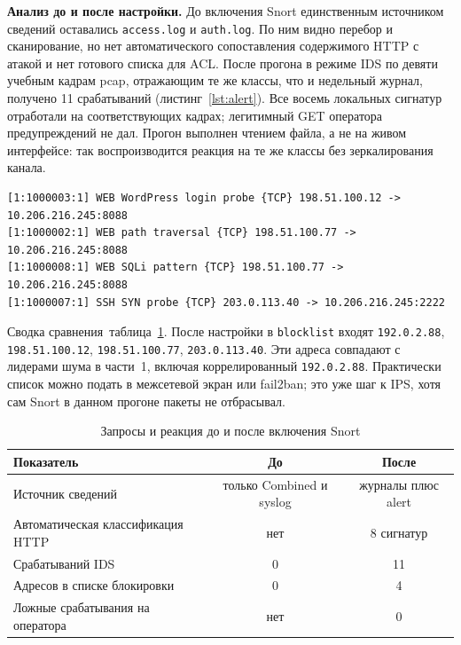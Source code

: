 \textbf{Анализ до и после настройки.}
До включения Snort единственным источником сведений оставались \texttt{access.log} и \texttt{auth.log}. По ним видно перебор и сканирование, но нет автоматического сопоставления содержимого HTTP с атакой и нет готового списка для ACL. После прогона в режиме IDS по девяти учебным кадрам pcap, отражающим те же классы, что и недельный журнал, получено 11 срабатываний (листинг~\ref{lst:alert}). Все восемь локальных сигнатур отработали на соответствующих кадрах; легитимный GET оператора предупреждений не дал. Прогон выполнен чтением файла, а не на живом интерфейсе: так воспроизводится реакция на те же классы без зеркалирования канала.

\begin{lstlisting}[caption={Фрагмент журнала alert Snort},label={lst:alert},basicstyle=\footnotesize\ttfamily]
[1:1000003:1] WEB WordPress login probe {TCP} 198.51.100.12 -> 10.206.216.245:8088
[1:1000002:1] WEB path traversal {TCP} 198.51.100.77 -> 10.206.216.245:8088
[1:1000008:1] WEB SQLi pattern {TCP} 198.51.100.77 -> 10.206.216.245:8088
[1:1000007:1] SSH SYN probe {TCP} 203.0.113.40 -> 10.206.216.245:2222
\end{lstlisting}

Сводка сравнения~\mdash  таблица~\ref{tab:before}. После настройки в \texttt{blocklist} входят \texttt{192.0.2.88}, \texttt{198.51.100.12}, \texttt{198.51.100.77}, \texttt{203.0.113.40}. Эти адреса совпадают с лидерами шума в части~1, включая коррелированный \texttt{192.0.2.88}. Практически список можно подать в межсетевой экран или fail2ban; это уже шаг к IPS, хотя сам Snort в данном прогоне пакеты не отбрасывал.

\begin{table}[H]
	\begin{tabularx}{\textwidth}{|X|c|c|}
		\hline
		\textbf{Показатель} & \textbf{До} & \textbf{После} \\
		\hline
		Источник сведений & только Combined и syslog & журналы плюс alert \\
		\hline
		Автоматическая классификация HTTP & нет & 8 сигнатур \\
		\hline
		Срабатываний IDS & 0 & 11 \\
		\hline
		Адресов в списке блокировки & 0 & 4 \\
		\hline
		Ложные срабатывания на оператора & нет & 0 \\
		\hline
	\end{tabularx}
	\caption{Запросы и реакция до и после включения Snort}
	\label{tab:before}
\end{table}

